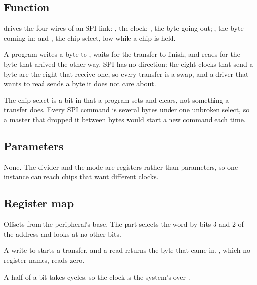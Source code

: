 
%
{}

\subsection*{Function}

 drives the four wires of an SPI link: , the
clock; , the byte going out; , the byte coming
in; and , the chip select, low while a chip is held.

A program writes a byte to , waits for the transfer to
finish, and reads  for the byte that arrived the other way.
SPI has no direction: the eight clocks that send a byte are the eight
that receive one, so every transfer is a swap, and a driver that wants
to read sends a byte it does not care about.

The chip select is a bit in  that a program sets and
clears, not something a transfer does. Every SPI command is several
bytes under one unbroken select, so a master that dropped it between
bytes would start a new command each time.

\subsection*{Parameters}

None. The divider and the mode are registers rather than parameters,
so one instance can reach chips that want different clocks.

\subsection*{Register map}

Offsets from the peripheral's base. The part selects the word by bits
3 and 2 of the address and looks at no other bits.


A write to  starts a transfer, and a read returns the byte
that came in. , which no register names, reads zero.

A half of a bit takes  cycles, so the clock is the
system's over .

